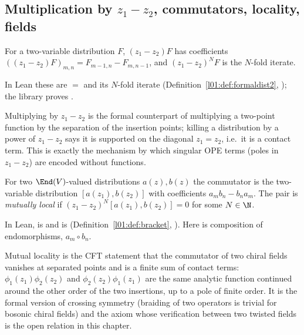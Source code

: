 \subsection{Multiplication by \texorpdfstring{$z_1-z_2$}{z1-z2}, commutators, locality, fields}

\begin{definition}\label{ch10:def:mulbysub}
For a two-variable distribution $F$, $(z_1-z_2)F$ has coefficients
$((z_1-z_2)F)_{m,n}=F_{m-1,n}-F_{m,n-1}$, and $(z_1-z_2)^NF$ is the $N$-fold iterate.
\end{definition}

In Lean these are  $=$  and its $N$-fold iterate
 (Definition~\ref{l01:def:formaldist2},
); the library proves
.

\begin{physics}
Multiplying by $z_1-z_2$ is the formal counterpart of multiplying a two-point function by the separation of the insertion points; killing a distribution by a power of $z_1-z_2$ says it is supported on the diagonal $z_1=z_2$, i.e.\ it is a contact term. This is exactly the mechanism by which singular OPE terms (poles in $z_1-z_2$) are encoded without functions.
\end{physics}

\begin{definition}\label{ch10:def:local}
For two $\End(V)$-valued distributions $a(z),b(z)$ the commutator is the two-variable distribution
$[a(z_1),b(z_2)]$ with coefficients $a_mb_n-b_na_m$.  The pair is \emph{mutually local} if
$(z_1-z_2)^N[a(z_1),b(z_2)]=0$ for some $N\in\N$.
\end{definition}

In Lean,  is  and 
is  (Definition~\ref{l01:def:bracket},
).  Here  is composition of
endomorphisms, $a_m\circ b_n$.

\begin{physics}
Mutual locality is the CFT statement that the commutator of two chiral fields vanishes at separated points and is a finite sum of contact terms: $\phi_1(z_1)\phi_2(z_2)$ and $\phi_2(z_2)\phi_1(z_1)$ are the same analytic function continued around the other order of the two insertions, up to a pole of finite order. It is the formal version of crossing symmetry (braiding of two operators is trivial for bosonic chiral fields) and the axiom whose verification between two twisted fields is the open relation in this chapter.
\end{physics}

